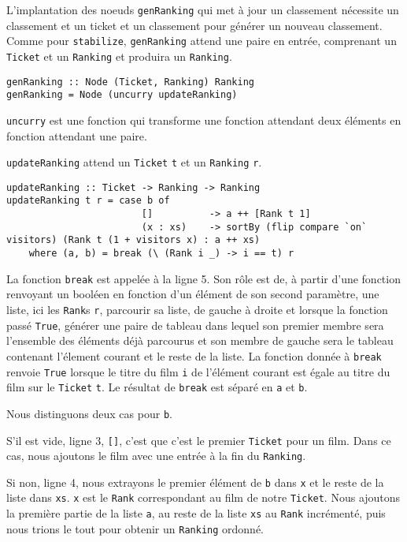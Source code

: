 \documentclass{llncs}
\begin{document}
L'implantation des noeuds \lstinline{genRanking} qui met à jour un classement
nécessite un classement et un ticket et un classement pour générer un nouveau classement.
Comme pour \lstinline{stabilize}, \lstinline{genRanking} attend une paire en
entrée, comprenant un \lstinline{Ticket} et un \lstinline{Ranking} et produira
un \lstinline{Ranking}.
\begin{lstlisting}
genRanking :: Node (Ticket, Ranking) Ranking
genRanking = Node (uncurry updateRanking)
\end{lstlisting}
\lstinline{uncurry} est une fonction qui transforme une fonction attendant deux éléments
en fonction attendant une paire.

\lstinline{updateRanking} attend un \lstinline{Ticket} \lstinline{t} et un
\lstinline{Ranking} \lstinline{r}.
\begin{lstlisting}
updateRanking :: Ticket -> Ranking -> Ranking
updateRanking t r = case b of
                        []          -> a ++ [Rank t 1]
                        (x : xs)    -> sortBy (flip compare `on` visitors) (Rank t (1 + visitors x) : a ++ xs)
    where (a, b) = break (\ (Rank i _) -> i == t) r
\end{lstlisting}
La fonction \lstinline{break} est appelée à la ligne 5.
Son rôle est de, à partir d'une fonction renvoyant un booléen en fonction d'un
élément de son second paramètre, une liste, ici les \lstinline{Rank}s \lstinline{r},
parcourir sa liste, de gauche à droite et lorsque la fonction passé
\lstinline{True}, générer une
paire de tableau dans lequel son premier membre sera l'ensemble des éléments déjà
parcourus et son membre de gauche sera le tableau contenant l'élement courant et
le reste de la liste.
La fonction donnée à \lstinline{break} renvoie \lstinline{True} lorsque le titre
du film \lstinline{i} de l'élément courant est égale au titre du film sur le
\lstinline{Ticket} \lstinline{t}.
Le résultat de \lstinline{break} est séparé en \lstinline{a} et \lstinline{b}.

Nous distinguons deux cas pour \lstinline{b}.

S'il est vide, ligne 3, \lstinline{[]}, c'est que c'est le premier \lstinline{Ticket}
pour un film.
Dans ce cas, nous ajoutons le film avec une entrée à la fin du \lstinline{Ranking}.

Si non, ligne 4, nous extrayons le premier élément de \lstinline{b} dans \lstinline{x}
et le reste de la liste dans \lstinline{xs}.
\lstinline{x} est le \lstinline{Rank} correspondant au film de notre \lstinline{Ticket}.
Nous ajoutons la première partie de la liste \lstinline{a}, au reste de la liste
\lstinline{xs} au \lstinline{Rank} incrémenté, puis nous trions le tout pour obtenir
un \lstinline{Ranking} ordonné.
\end{document}
